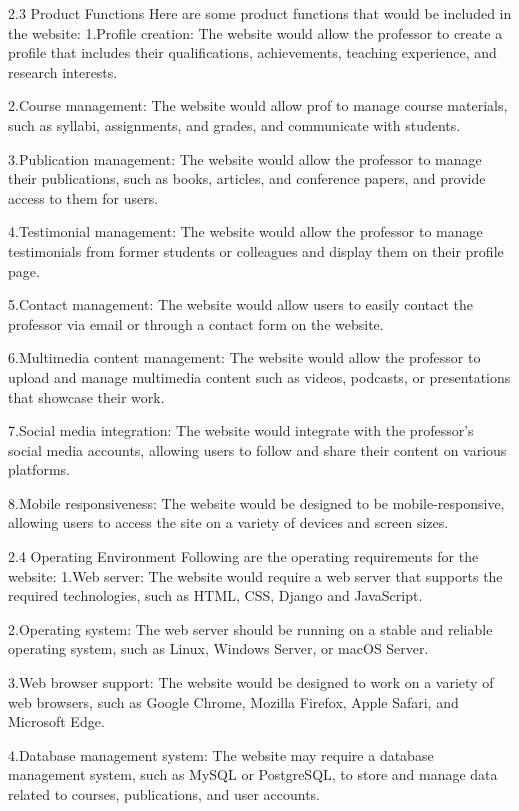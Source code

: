 2.3 Product Functions
Here are some product functions that would be included in the website:
1.Profile creation: The website would allow the professor to create a profile that includes their qualifications, achievements, teaching experience, and research interests.

2.Course management: The website would allow prof to manage course materials, such as syllabi, assignments, and grades, and communicate with students.

3.Publication management: The website would allow the professor to manage their publications, such as books, articles, and conference papers, and provide access to them for users.

4.Testimonial management: The website would allow the professor to manage testimonials from former students or colleagues and display them on their profile page.

5.Contact management: The website would allow users to easily contact the professor via email or through a contact form on the website.

6.Multimedia content management: The website would allow the professor to upload and manage multimedia content such as videos, podcasts, or presentations that showcase their work.

7.Social media integration: The website would integrate with the professor's social media accounts, allowing users to follow and share their content on various platforms.

8.Mobile responsiveness: The website would be designed to be mobile-responsive, allowing users to access the site on a variety of devices and screen sizes.

2.4 Operating Environment
Following are the operating requirements for the website:
1.Web server: The website would require a web server that supports the required technologies, such as HTML, CSS, Django and JavaScript.

2.Operating system: The web server should be running on a stable and reliable operating system, such as Linux, Windows Server, or macOS Server.

3.Web browser support: The website would be designed to work on a variety of web browsers, such as Google Chrome, Mozilla Firefox, Apple Safari, and Microsoft Edge.

4.Database management system: The website may require a database management system, such as MySQL or PostgreSQL, to store and manage data related to courses, publications, and user accounts.

